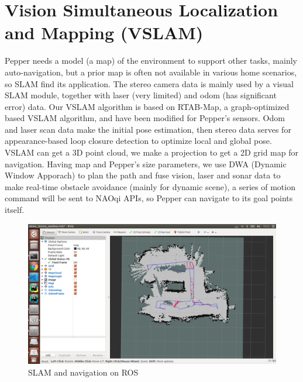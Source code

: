 \section{Vision Simultaneous Localization and Mapping (VSLAM)}
\label{sec:vslam}

Pepper needs a model (a map) of the environment to support other tasks, mainly auto-navigation, but a prior map is often not available in various home scenarios, so SLAM find its application. 
The stereo camera data is mainly used by a visual SLAM module, together with laser (very limited) and odom (has significant error) data. 
Our VSLAM algorithm is based on RTAB-Map, a graph-optimized based VSLAM algorithm, and have been modified for Pepper's sensors. 
Odom and laser scan data make the initial pose estimation, then stereo data serves for appearance-based loop closure detection to optimize local and global pose. 
VSLAM can get a 3D point cloud, we make a projection to get a 2D grid map for navigation. 
Having map and Pepper’s size parameters, we use DWA (Dynamic Window Apporach) to plan the path and fuse vision, laser and sonar data to make real-time obstacle avoidance (mainly for dynamic scene), a series of motion command will be sent to NAOqi APIs, so Pepper can navigate to its goal points itself.

\begin{figure}[h]
    \centering
    \includegraphics[width=1.\textwidth]{figs/vslam_shortcut.png}
    \caption{SLAM and navigation on ROS}
    \label{fig:vslam}
\end{figure}